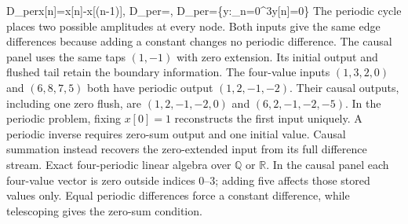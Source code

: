 {D_{\rm per}x[n]=x[n]-x[(n-1)],\quad
\ker D_{\rm per}=\langle{}\rangle,\quad
{}D_{\rm per}=\left\{y:\sum_{n=0}^3y[n]=0\right\}}
{The periodic cycle places two possible amplitudes at every node. Both inputs give the same edge differences because adding a constant changes no periodic difference. The causal panel uses the same taps $(1,-1)$ with zero extension. Its initial output and flushed tail retain the boundary information.}
{The four-value inputs $(1,3,2,0)$ and $(6,8,7,5)$ both have periodic output $(1,2,-1,-2)$. Their causal outputs, including one zero flush, are $(1,2,-1,-2,0)$ and $(6,2,-1,-2,-5)$. In the periodic problem, fixing $x[0]=1$ reconstructs the first input uniquely.}
{A periodic inverse requires zero-sum output and one initial value. Causal summation instead recovers the zero-extended input from its full difference stream.}
{Exact four-periodic linear algebra over $\mathbb Q$ or $\mathbb R$. In the causal panel each four-value vector is zero outside indices $0$--$3$; adding five affects those stored values only. Equal periodic differences force a constant difference, while telescoping gives the zero-sum condition.}
